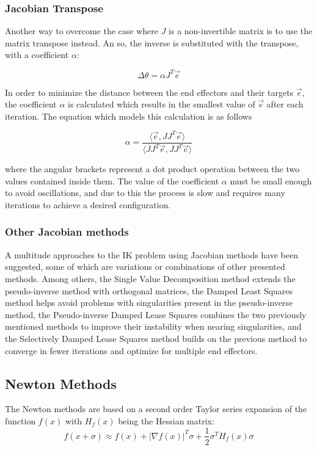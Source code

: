 \subsubsection{Jacobian Transpose}
Another way to overcome the case where \(J\) is a non-invertible matrix is to
use the matrix transpose instead. An so, the inverse is substituted with the
transpose, with a coefficient \(\alpha\):

\begin{equation}
    \Delta \theta = \alpha J^T \vec{e}
\end{equation}

In order to minimize the distance between the end effectors and their targets
\(\vec{e}\), the coefficient \(\alpha\) is calculated which results in the
smallest value of \(\vec{e}\) after each iteration. The equation which models
this calculation is as follows

\begin{equation}
    \alpha = \frac
        {
            \langle\vec{e}, J J^T \vec{e}\rangle
        }
        {
            \langle J J^T \vec{e},J J^T \vec{e} \rangle
        }
\end{equation}

where the angular brackets represent a dot product operation between the two
values contained inside them. The value of the coefficient \(\alpha\) must be
small enough to avoid oscillations, and due to this the process is slow and
requires many iterations to achieve a desired configuration.

\subsubsection{Other Jacobian methods}
A multitude approaches to the IK problem using Jacobian methods have been
suggested, some of which are variations or combinations of other presented
methods. Among others, the Single Value Decomposition method extends the
pseudo-inverse method with orthogonal matrices, the Damped Least Squares method
helps avoid problems with singularities present in the pseudo-inverse method,
the Pseudo-inverse Damped Lease Squares combines the two previously mentioned
methods to improve their instability when nearing singularities, and the
Selectively Damped Lease Squares method builds on the previous method to
converge in fewer iterations and optimize for multiple end effectors.

\subsection{Newton Methods}
The Newton methods are based on a second order Taylor series expansion of the
function \(f(x)\) with \(H_f(x)\) being the Hessian matrix:
\begin{equation}
    f(x + \sigma) \approx f(x) + |\nabla f(x)|^T \sigma + \frac{1}{2} \sigma^T H_f(x)
    \sigma
\end{equation}

